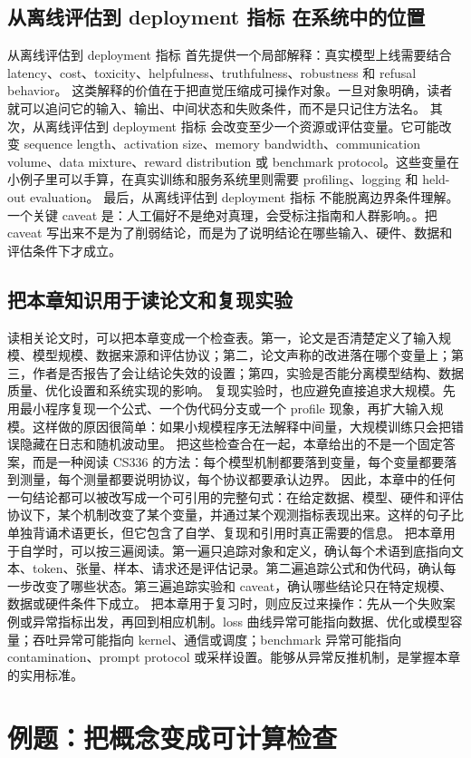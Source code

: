 \documentclass[a4paper]{article}
\begin{document}
\subsection{从离线评估到 deployment 指标 在系统中的位置}
从离线评估到 deployment 指标 首先提供一个局部解释：真实模型上线需要结合 latency、cost、toxicity、helpfulness、truthfulness、robustness 和 refusal behavior。 这类解释的价值在于把直觉压缩成可操作对象。一旦对象明确，读者就可以追问它的输入、输出、中间状态和失败条件，而不是只记住方法名。
其次，从离线评估到 deployment 指标 会改变至少一个资源或评估变量。它可能改变 sequence length、activation size、memory bandwidth、communication volume、data mixture、reward distribution 或 benchmark protocol。这些变量在小例子里可以手算，在真实训练和服务系统里则需要 profiling、logging 和 held-out evaluation。
最后，从离线评估到 deployment 指标 不能脱离边界条件理解。一个关键 caveat 是：人工偏好不是绝对真理，会受标注指南和人群影响。。把 caveat 写出来不是为了削弱结论，而是为了说明结论在哪些输入、硬件、数据和评估条件下才成立。
\subsection{把本章知识用于读论文和复现实验}
读相关论文时，可以把本章变成一个检查表。第一，论文是否清楚定义了输入规模、模型规模、数据来源和评估协议；第二，论文声称的改进落在哪个变量上；第三，作者是否报告了会让结论失效的设置；第四，实验是否能分离模型结构、数据质量、优化设置和系统实现的影响。
复现实验时，也应避免直接追求大规模。先用最小程序复现一个公式、一个伪代码分支或一个 profile 现象，再扩大输入规模。这样做的原因很简单：如果小规模程序无法解释中间量，大规模训练只会把错误隐藏在日志和随机波动里。
把这些检查合在一起，本章给出的不是一个固定答案，而是一种阅读 CS336 的方法：每个模型机制都要落到变量，每个变量都要落到测量，每个测量都要说明协议，每个协议都要承认边界。
因此，本章中的任何一句结论都可以被改写成一个可引用的完整句式：在给定数据、模型、硬件和评估协议下，某个机制改变了某个变量，并通过某个观测指标表现出来。这样的句子比单独背诵术语更长，但它包含了自学、复现和引用时真正需要的信息。
把本章用于自学时，可以按三遍阅读。第一遍只追踪对象和定义，确认每个术语到底指向文本、token、张量、样本、请求还是评估记录。第二遍追踪公式和伪代码，确认每一步改变了哪些状态。第三遍追踪实验和 caveat，确认哪些结论只在特定规模、数据或硬件条件下成立。
把本章用于复习时，则应反过来操作：先从一个失败案例或异常指标出发，再回到相应机制。loss 曲线异常可能指向数据、优化或模型容量；吞吐异常可能指向 kernel、通信或调度；benchmark 异常可能指向 contamination、prompt protocol 或采样设置。能够从异常反推机制，是掌握本章的实用标准。
\section{例题：把概念变成可计算检查}
\end{document}
